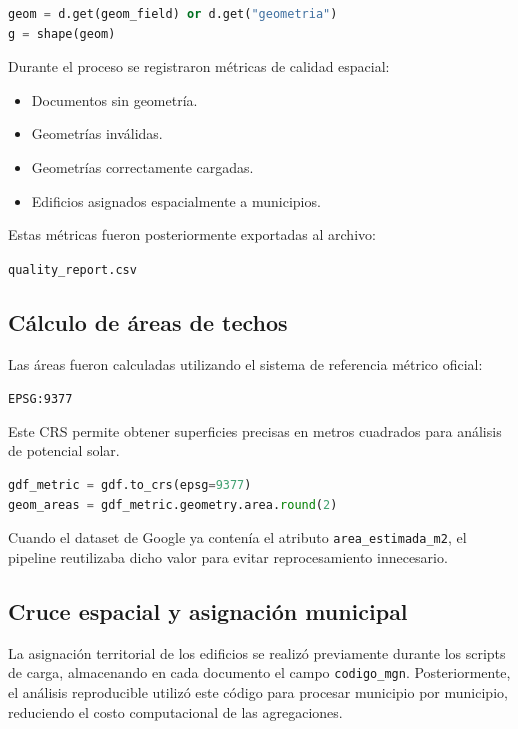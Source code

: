 \documentclass{article}
\begin{document}
\begin{lstlisting}[language=Python, caption={Conversión de geometrías GeoJSON}]
geom = d.get(geom_field) or d.get("geometria")
g = shape(geom)
\end{lstlisting}

Durante el proceso se registraron métricas de calidad espacial:

\begin{itemize}
    \item Documentos sin geometría.
    \item Geometrías inválidas.
    \item Geometrías correctamente cargadas.
    \item Edificios asignados espacialmente a municipios.
\end{itemize}

Estas métricas fueron posteriormente exportadas al archivo:

\begin{center}
\texttt{quality\_report.csv}
\end{center}

\subsection{Cálculo de áreas de techos}

Las áreas fueron calculadas utilizando el sistema de referencia métrico oficial:

\begin{center}
\texttt{EPSG:9377}
\end{center}

Este CRS permite obtener superficies precisas en metros cuadrados para análisis de potencial solar.

\begin{lstlisting}[language=Python, caption={Cálculo de áreas en CRS métrico}]
gdf_metric = gdf.to_crs(epsg=9377)
geom_areas = gdf_metric.geometry.area.round(2)
\end{lstlisting}

Cuando el dataset de Google ya contenía el atributo \texttt{area\_estimada\_m2}, el pipeline reutilizaba dicho valor para evitar reprocesamiento innecesario.

\clearpage
\subsection{Cruce espacial y asignación municipal}

La asignación territorial de los edificios se realizó previamente durante los scripts de carga, almacenando en cada documento el campo \texttt{codigo\_mgn}. Posteriormente, el análisis reproducible utilizó este código para procesar municipio por municipio, reduciendo el costo computacional de las agregaciones.
\end{document}
